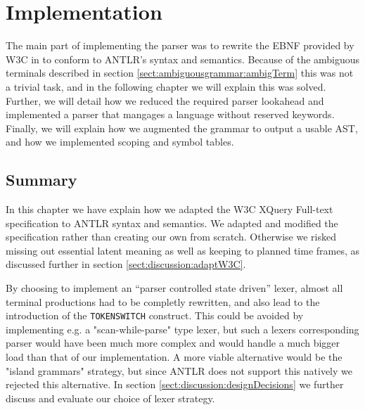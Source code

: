 \chapter{Implementation}
\label{chapter:implementation}

The main part of implementing the parser was to rewrite the EBNF provided by
W3C in \cite{w3c01} to conform to ANTLR's syntax and semantics. Because of the
ambiguous terminals described in section \ref{sect:ambiguousgrammar:ambigTerm}
this was not a trivial task, and in the following chapter we will explain this
was solved. Further, we will detail how we reduced the required parser
lookahead and implemented a parser that mangages a language without reserved
keywords. Finally, we will explain how we augmented the grammar to output a
usable AST, and how we implemented scoping and symbol tables.













\section{Summary}
In this chapter we have explain how we adapted the W3C
XQuery Full-text specification to ANTLR syntax and semantics. We adapted and
modified the specification rather than creating our own from scratch. Otherwise
we risked missing out essential latent meaning as well as keeping to planned
time frames, as discussed further in section \ref{sect:discussion:adaptW3C}.    

By choosing to implement an ``parser controlled state driven'' lexer, almost all
terminal productions  had to be completly rewritten, and also lead to the
introduction of the \verb!TOKENSWITCH! construct. This could be avoided by
implementing e.g. a "scan-while-parse" type lexer, but such a lexers
corresponding parser would have been much more complex and would handle a much
bigger load than that of our implementation. A more viable alternative would be
the "island grammars" strategy, but since ANTLR does not support this natively we
rejected this alternative. In section \ref{sect:discussion:designDecisions} we
further discuss and evaluate our choice of lexer strategy.


